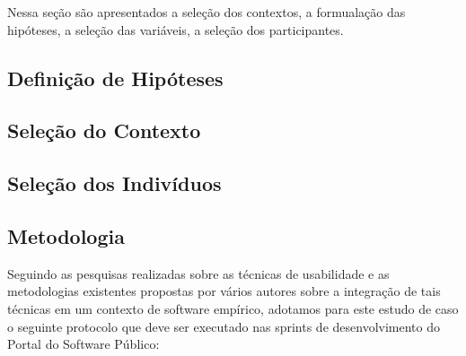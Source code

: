 Nessa seção são apresentados a seleção dos contextos, a formualação das hipóteses, a seleção das variáveis, a seleção dos participantes.


\subsection{Definição de Hipóteses}

\subsection{Seleção do Contexto}



\subsection{Seleção dos Indivíduos}


\subsection{Metodologia}

	Seguindo as pesquisas realizadas sobre as técnicas de usabilidade e as metodologias existentes propostas por vários autores sobre a integração de tais técnicas em um contexto de software empírico, adotamos para este estudo de caso o seguinte protocolo que deve ser executado nas sprints de desenvolvimento do Portal do Software Público:
	
